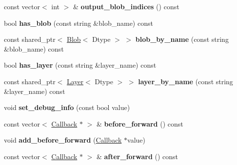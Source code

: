 \begin{DoxyCompactItemize}
const vector$<$ int $>$ \& {\bfseries output\+\_\+blob\+\_\+indices} () const
\item 
\mbox{\label{classcaffe_1_1_net_a5e0397a88782627b93532800e825e42b}} 
bool {\bfseries has\+\_\+blob} (const string \&blob\+\_\+name) const
\item 
\mbox{\label{classcaffe_1_1_net_a10fed2aead47dd28291d5edbb0385e4f}} 
const shared\+\_\+ptr$<$ \mbox{\hyperlink{classcaffe_1_1_blob}{Blob}}$<$ Dtype $>$ $>$ {\bfseries blob\+\_\+by\+\_\+name} (const string \&blob\+\_\+name) const
\item 
\mbox{\label{classcaffe_1_1_net_a86c0a37d300bcf100d18f40b3f50032d}} 
bool {\bfseries has\+\_\+layer} (const string \&layer\+\_\+name) const
\item 
\mbox{\label{classcaffe_1_1_net_a5be1bd7e4b47070ebe725b80016a7e96}} 
const shared\+\_\+ptr$<$ \mbox{\hyperlink{classcaffe_1_1_layer}{Layer}}$<$ Dtype $>$ $>$ {\bfseries layer\+\_\+by\+\_\+name} (const string \&layer\+\_\+name) const
\item 
\mbox{\label{classcaffe_1_1_net_a5b43ec32a7940703ecc3d0fa80bb2f91}} 
void {\bfseries set\+\_\+debug\+\_\+info} (const bool value)
\item 
\mbox{\label{classcaffe_1_1_net_a29cac2b39bbfcf0891d34deecdb4f2a9}} 
const vector$<$ \mbox{\hyperlink{classcaffe_1_1_net_1_1_callback}{Callback}} $\ast$ $>$ \& {\bfseries before\+\_\+forward} () const
\item 
\mbox{\label{classcaffe_1_1_net_ab38efc0662826a18034817b484ea0b88}} 
void {\bfseries add\+\_\+before\+\_\+forward} (\mbox{\hyperlink{classcaffe_1_1_net_1_1_callback}{Callback}} $\ast$value)
\item 
\mbox{\label{classcaffe_1_1_net_a262da4bf0282c2e8615d3bd0b3582991}} 
const vector$<$ \mbox{\hyperlink{classcaffe_1_1_net_1_1_callback}{Callback}} $\ast$ $>$ \& {\bfseries after\+\_\+forward} () const
\item 
\mbox{\label{classcaffe_1_1_net_a27f0234629c0131b23c577713bb8209e}} 

\end{DoxyCompactItemize}
